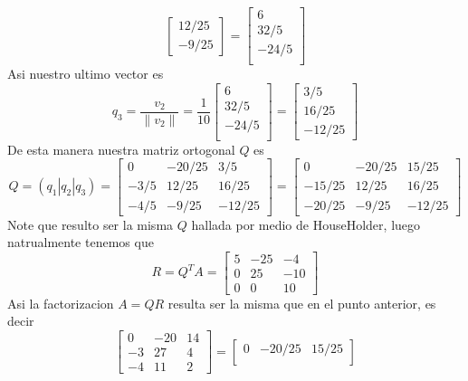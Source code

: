 \begin{enumerate}
\begin{solution}
$$\begin{bmatrix}
            12/25\\
            -9/25
        \end{bmatrix}=\begin{bmatrix}
            6\\
             32/5\\
             -24/5\\
        \end{bmatrix}$$
        Asi nuestro ultimo vector es 
        $$q_3=\frac{v_2}{\|v_2\|}=\frac{1}{10}\begin{bmatrix}
            6\\
             32/5\\
             -24/5\\
        \end{bmatrix}=\begin{bmatrix}
            3/5\\
            16/25\\
            -12/25
        \end{bmatrix}$$
        De esta manera nuestra matriz ortogonal $Q$ es
        $$Q=(q_1|q_2|q_3)=\begin{bmatrix}
            0 &-20/25&3/5\\
            -3/5&12/25&16/25\\
            -4/5&-9/25&-12/25
        \end{bmatrix}=\begin{bmatrix}
                0&-20/25&15/25\\
                -15/25&12/25&16/25\\
                -20/25&-9/25&-12/25
            \end{bmatrix}$$
        Note que resulto ser la misma $Q$ hallada por medio de HouseHolder, luego natrualmente tenemos que
        $$R=Q^TA=\begin{bmatrix}
                5& -25& -4\\
                0& 25& -10\\
                0& 0& 10
            \end{bmatrix}$$
        Asi la factorizacion $A=QR$ resulta ser la misma que en el punto anterior, es decir
        $$\begin{bmatrix} 0 & -20 & 14 \\ -3 & 27 & 4 \\ -4 & 11 & 2 \end{bmatrix}=\begin{bmatrix}
                0&-20/25&15/25\\

\end{bmatrix}$$
\end{solution}
\end{enumerate}
